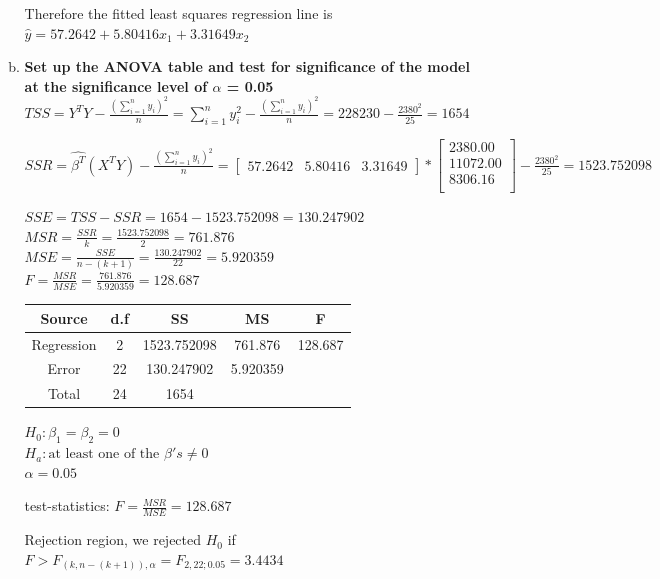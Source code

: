 \documentclass{article}
\begin{document}
\begin{enumerate}[1.]
\begin{enumerate}[(a)]
Therefore the fitted least squares regression line is $\hat{y} = 57.2642 + 5.80416x_1 + 3.31649x_2$

\item \textbf{ Set up the ANOVA table and test for significance of the model at the significance level of $\alpha$ = 0.05 } \\
$TSS = Y^TY - \frac{(\sum_{i=1}^{n}{y_i})^2}{n} = \sum_{i=1}^{n}{y_i^2} - \frac{(\sum_{i=1}^{n}{y_i})^2}{n}  = 228230 - \frac{2380^2}{25} = 1654$

$SSR = \hat{\beta^T}(X^TY)  - \frac{(\sum_{i=1}^{n}{y_i})^2}{n}  = \begin{bmatrix}
57.2642 & 5.80416 & 3.31649
\end{bmatrix} * \begin{bmatrix}
2380.00 \\
11072.00 \\
8306.16 \\
\end{bmatrix} - \frac{2380^2}{25} = 1523.752098$

$SSE = TSS - SSR = 1654 - 1523.752098 = 130.247902$ \\
$MSR = \frac{SSR}{k} = \frac{1523.752098}{2} = 761.876$ \\
$MSE = \frac{SSE}{n-(k+1)} = \frac{130.247902}{22} = 5.920359$ \\
$F = \frac{MSR}{MSE} = \frac{761.876}{5.920359} =128.687$ \\

\begin{center}
 \begin{tabular}{||c c c c c||} 
 \hline
Source & d.f & SS & MS & F \\ [0.5ex] 
 \hline\hline
Regression & 2 & 1523.752098 & 761.876 & 128.687 \\
 \hline
Error & 22 & 130.247902 &  5.920359 &  \\
 \hline
Total & 24  & 1654 & & \\ [1ex]
 \hline
\end{tabular}
\end{center}

$H_0: \beta_1 = \beta_2 = 0$ \\
$H_a: \text{at least one of the } \beta's \neq 0$ \\
$\alpha = 0.05$

test-statistics: $F = \frac{MSR}{MSE} = 128.687$

Rejection region, we rejected $H_0$ if $F > F_{(k, n-(k+1)), \alpha} = F_{2, 22; 0.05} = 3.4434$


\end{enumerate}
\end{enumerate}
\end{document}
